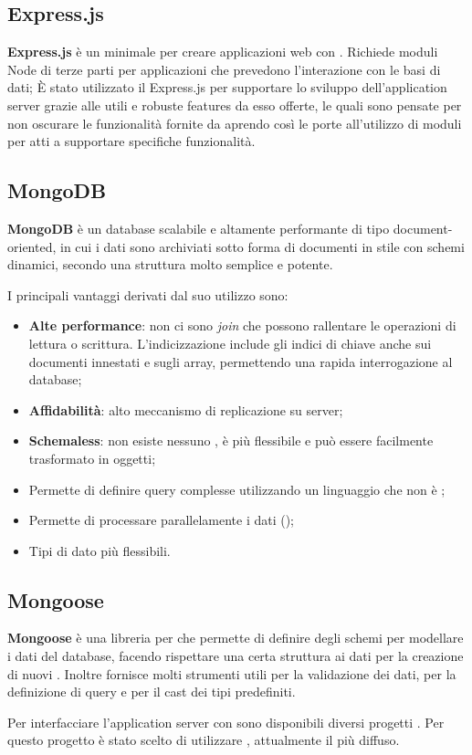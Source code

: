 \subsection{Express.js}
\textbf{Express.js} è un  minimale per creare applicazioni web con . Richiede moduli Node di terze parti per applicazioni che prevedono l’interazione con le basi di dati; \newline
È stato utilizzato il  Express.js per supportare lo sviluppo dell'application server grazie alle utili e robuste features da esso offerte, le quali sono pensate per non oscurare le funzionalità fornite da  aprendo così le porte all'utilizzo di moduli per  atti a supportare specifiche funzionalità.

\subsection{MongoDB}
\textbf{MongoDB} è un database   scalabile e altamente performante di tipo document-oriented, in cui i dati sono archiviati sotto forma di documenti in stile  con schemi dinamici, secondo una struttura molto semplice e potente.

I principali vantaggi derivati dal suo utilizzo sono:
\begin{itemize}
	\item \textbf{Alte performance}: non ci sono \emph{join} che possono rallentare le operazioni di lettura o scrittura. L’indicizzazione include gli indici di chiave anche sui documenti innestati e sugli array, permettendo una rapida interrogazione al database;
	\item \textbf{Affidabilità}: alto meccanismo di replicazione su server;
	\item \textbf{Schemaless}: non esiste nessuno , è più flessibile e può essere facilmente trasformato in oggetti;	
	\item Permette di definire query complesse utilizzando un linguaggio che non è ;
	\item Permette di processare parallelamente i dati ();
	\item Tipi di dato più flessibili.
\end{itemize}

\subsection{Mongoose}
\textbf{Mongoose} è una libreria per  che permette di definire degli schemi per modellare i dati del database, facendo rispettare una certa struttura ai dati per la creazione di nuovi . Inoltre fornisce molti strumenti utili per la validazione dei dati, per la definizione di query e per il cast dei tipi predefiniti.

Per interfacciare l'application server con  sono disponibili diversi progetti . Per questo progetto è stato scelto di utilizzare , attualmente il più diffuso.